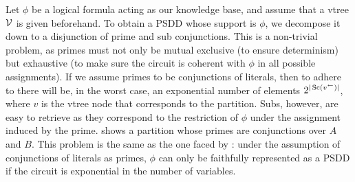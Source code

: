 Let $\phi$ be a logical formula acting as our knowledge base, and assume that a vtree $\operatorname{\mathcal{V}}$ is
given beforehand. To obtain a PSDD whose support is $\phi$, we decompose it down to a disjunction of
prime and sub conjunctions. This is a non-trivial problem, as primes must not only be mutual
exclusive (to ensure determinism) but exhaustive (to make sure the circuit is coherent with $\phi$
in all possible assignments). If we assume primes to be conjunctions of literals, then to adhere to
 there will be, in the worst case, an exponential number of elements
$2^{|\operatorname*{\normalfont{Sc}}(v^\gets)|}$, where $v$ is the vtree node that corresponds to the partition. Subs, however,
are easy to retrieve as they correspond to the restriction of $\phi$ under the assignment induced
by the prime.  shows a partition whose primes are conjunctions over $A$ and
$B$. This problem is the same as the one faced by \citet{geh20}: under the assumption of
conjunctions of literals as primes, $\phi$ can only be faithfully represented as a PSDD if the
circuit is exponential in the number of variables.

